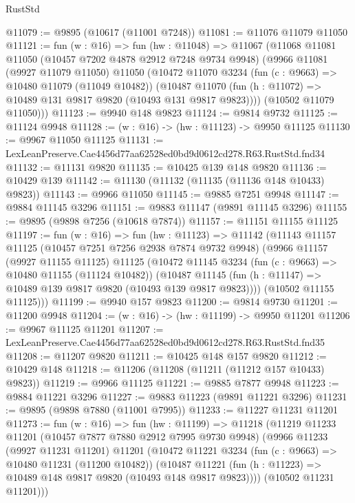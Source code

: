 \begin{lexlean}{RustStd}
\begin{coremodule}
@11079 := @9895 (@10617 (@11001 @7248))
@11081 := @11076 @11079 @11050
@11121 := fun (w : @16) =>
  fun (hw : @11048) =>
  @11067
    (@11068
      @11081
      @11050
      (@10457 @7202 @4878 @2912 @7248 @9734 @9948)
      (@9966
        @11081
        (@9927 @11079 @11050)
        @11050
        (@10472
          @11070
          @3234
          (fun (c : @9663) => @10480 @11079 (@11049 @10482))
          (@10487 @11070 (fun (h : @11072) => @10489 @131 @9817 @9820 (@10493 @131 @9817 @9823))))
        (@10502 @11079 @11050)))
@11123 := @9940 @148 @9823
@11124 := @9814 @9732
@11125 := @11124 @9948
@11128 := (w : @16) -> (hw : @11123) -> @9950 @11125
@11130 := @9967 @11050 @11125
@11131 := LexLeanPreserve.Cae4456d77aa62528ed0bd9d0612cd278.R63.RustStd.fnd34
@11132 := @11131 @9820
@11135 := @10425 @139 @148 @9820
@11136 := @10429 @139
@11142 := @11130 (@11132 (@11135 (@11136 @148 @10433) @9823))
@11143 := @9966 @11050
@11145 := @9885 @7251 @9948
@11147 := @9884 @11145 @3296
@11151 := @9883 @11147 (@9891 @11145 @3296)
@11155 := @9895 (@9898 @7256 (@10618 @7874))
@11157 := @11151 @11155 @11125
@11197 := fun (w : @16) =>
  fun (hw : @11123) =>
  @11142
    (@11143
      @11157
      @11125
      (@10457 @7251 @7256 @2938 @7874 @9732 @9948)
      (@9966
        @11157
        (@9927 @11155 @11125)
        @11125
        (@10472
          @11145
          @3234
          (fun (c : @9663) => @10480 @11155 (@11124 @10482))
          (@10487 @11145 (fun (h : @11147) => @10489 @139 @9817 @9820 (@10493 @139 @9817 @9823))))
        (@10502 @11155 @11125)))
@11199 := @9940 @157 @9823
@11200 := @9814 @9730
@11201 := @11200 @9948
@11204 := (w : @16) -> (hw : @11199) -> @9950 @11201
@11206 := @9967 @11125 @11201
@11207 := LexLeanPreserve.Cae4456d77aa62528ed0bd9d0612cd278.R63.RustStd.fnd35
@11208 := @11207 @9820
@11211 := @10425 @148 @157 @9820
@11212 := @10429 @148
@11218 := @11206 (@11208 (@11211 (@11212 @157 @10433) @9823))
@11219 := @9966 @11125
@11221 := @9885 @7877 @9948
@11223 := @9884 @11221 @3296
@11227 := @9883 @11223 (@9891 @11221 @3296)
@11231 := @9895 (@9898 @7880 (@11001 @7995))
@11233 := @11227 @11231 @11201
@11273 := fun (w : @16) =>
  fun (hw : @11199) =>
  @11218
    (@11219
      @11233
      @11201
      (@10457 @7877 @7880 @2912 @7995 @9730 @9948)
      (@9966
        @11233
        (@9927 @11231 @11201)
        @11201
        (@10472
          @11221
          @3234
          (fun (c : @9663) => @10480 @11231 (@11200 @10482))
          (@10487 @11221 (fun (h : @11223) => @10489 @148 @9817 @9820 (@10493 @148 @9817 @9823))))
        (@10502 @11231 @11201)))

\end{coremodule}
\end{lexlean}
